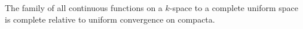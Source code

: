 The family of all continuous functions on a $k$-space to a complete uniform space is complete relative to uniform convergence on compacta.
